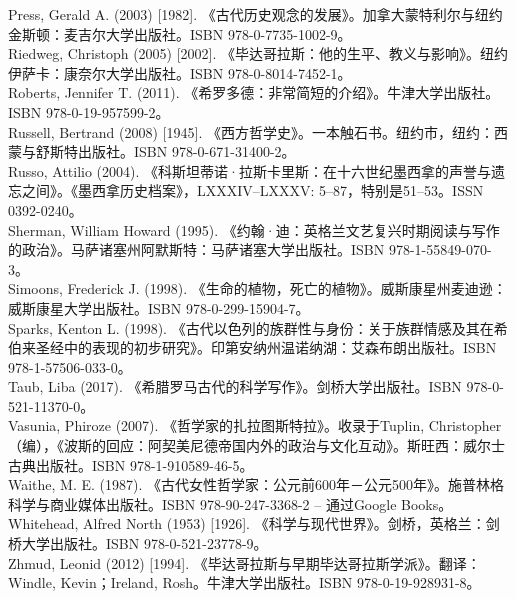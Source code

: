 Press, Gerald A. (2003) [1982]. 《古代历史观念的发展》。加拿大蒙特利尔与纽约金斯顿：麦吉尔大学出版社。ISBN 978-0-7735-1002-9。\\  
Riedweg, Christoph (2005) [2002]. 《毕达哥拉斯：他的生平、教义与影响》。纽约伊萨卡：康奈尔大学出版社。ISBN 978-0-8014-7452-1。\\  
Roberts, Jennifer T. (2011). 《希罗多德：非常简短的介绍》。牛津大学出版社。ISBN 978-0-19-957599-2。\\  
Russell, Bertrand (2008) [1945]. 《西方哲学史》。一本触石书。纽约市，纽约：西蒙与舒斯特出版社。ISBN 978-0-671-31400-2。\\  
Russo, Attilio (2004). 《科斯坦蒂诺·拉斯卡里斯：在十六世纪墨西拿的声誉与遗忘之间》。《墨西拿历史档案》，LXXXIV–LXXXV: 5–87，特别是51–53。ISSN 0392-0240。\\  
Sherman, William Howard (1995). 《约翰·迪：英格兰文艺复兴时期阅读与写作的政治》。马萨诸塞州阿默斯特：马萨诸塞大学出版社。ISBN 978-1-55849-070-3。\\  
Simoons, Frederick J. (1998). 《生命的植物，死亡的植物》。威斯康星州麦迪逊：威斯康星大学出版社。ISBN 978-0-299-15904-7。\\  
Sparks, Kenton L. (1998). 《古代以色列的族群性与身份：关于族群情感及其在希伯来圣经中的表现的初步研究》。印第安纳州温诺纳湖：艾森布朗出版社。ISBN 978-1-57506-033-0。\\  
Taub, Liba (2017). 《希腊罗马古代的科学写作》。剑桥大学出版社。ISBN 978-0-521-11370-0。\\  
Vasunia, Phiroze (2007). 《哲学家的扎拉图斯特拉》。收录于Tuplin, Christopher（编），《波斯的回应：阿契美尼德帝国内外的政治与文化互动》。斯旺西：威尔士古典出版社。ISBN 978-1-910589-46-5。\\  
Waithe, M. E. (1987). 《古代女性哲学家：公元前600年－公元500年》。施普林格科学与商业媒体出版社。ISBN 978-90-247-3368-2 – 通过Google Books。\\  
Whitehead, Alfred North (1953) [1926]. 《科学与现代世界》。剑桥，英格兰：剑桥大学出版社。ISBN 978-0-521-23778-9。\\  
Zhmud, Leonid (2012) [1994]. 《毕达哥拉斯与早期毕达哥拉斯学派》。翻译：Windle, Kevin；Ireland, Rosh。牛津大学出版社。ISBN 978-0-19-928931-8。
